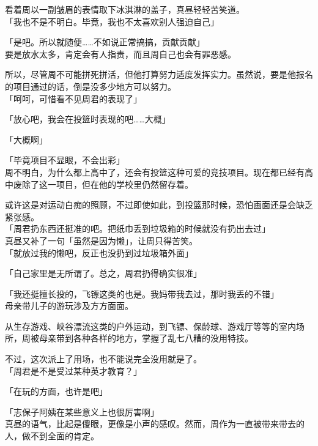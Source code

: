 看着周以一副皱眉的表情取下冰淇淋的盖子，真昼轻轻苦笑道。\\

「我也不是不明白。毕竟，我也不太喜欢别人强迫自己」

「是吧。所以就随便……不如说正常搞搞，贡献贡献」\\

要是放水太多，肯定会有人指责，而且周自己也会有罪恶感。

所以，尽管周不可能拼死拼活，但他打算努力适度发挥实力。虽然说，要是他报名的项目通过的话，倒是没多少地方可以努力。\\

「呵呵，可惜看不见周君的表现了」

「放心吧，我会在投篮时表现的吧……大概」

「大概啊」

「毕竟项目不显眼，不会出彩」\\

周不明白，为什么都上高中了，还会有投篮这种可爱的竞技项目。现在都已经有高中废除了这一项目，但在他的学校里仍然留存着。

或许这是对运动白痴的照顾，不过即使如此，到投篮那时候，恐怕画面还是会缺乏紧张感。\\

「周君扔东西还挺准的吧。把纸巾丢到垃圾箱的时候就没有扔出去过」\\

真昼又补了一句「虽然是因为懒」，让周只得苦笑。\\

「就放过我的懒吧，反正也没扔到过垃圾箱外面」

「自己家里是无所谓了。总之，周君扔得确实很准」

「我还挺擅长投的，飞镖这类的也是。我妈带我去过，那时我丢的不错」\\

母亲带儿子的游玩涉及方方面面。

从生存游戏、峡谷漂流这类的户外运动，到飞镖、保龄球、游戏厅等等的室内场所，周被母亲带到各种各样的地方，掌握了乱七八糟的没用特技。

不过，这次派上了用场，也不能说完全没用就是了。\\

「周君是不是受过某种英才教育？」

「在玩的方面，也许是吧」

「志保子阿姨在某些意义上也很厉害啊」\\

真昼的语气，比起是傻眼，更像是小声的感叹。然而，周作为一直被带来带去的人，做不到全面的肯定。\\

